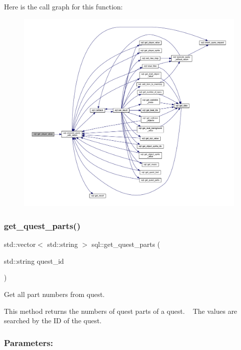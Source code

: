 Here is the call graph for this function\+:
\nopagebreak
\begin{figure}[H]
\begin{center}
\leavevmode
\includegraphics[width=350pt]{classsql_a251f53bb3d5d98f821713a42212276e9_cgraph}
\end{center}
\end{figure}
\mbox{\label{classsql_a9f75a32a77a498b1a328a53ade518ce7}} 
\subsubsection{\texorpdfstring{get\+\_\+quest\+\_\+parts()}{get\_quest\_parts()}}
{\footnotesize\ttfamily std\+::vector$<$ std\+::string $>$ sql\+::get\+\_\+quest\+\_\+parts (\begin{DoxyParamCaption}\item[{std\+::string}]{quest\+\_\+id }\end{DoxyParamCaption})}



Get all part numbers from quest. 

This method returns the numbers of quest parts of a quest. ~\newline
The values are searched by the ID of the quest. ~\newline


\subsubsection*{Parameters\+: }

